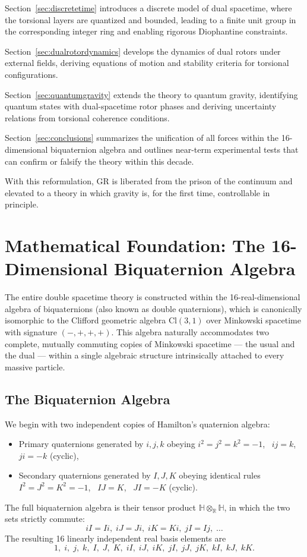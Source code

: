\documentclass[dvipdfmx,a4paper]{article}
\begin{document}
Section~\ref{sec:discretetime} introduces a discrete model of dual spacetime, where the torsional layers are quantized and bounded, leading to a finite unit group in the corresponding integer ring and enabling rigorous Diophantine constraints.

Section~\ref{sec:dualrotordynamics} develops the dynamics of dual rotors under external fields, deriving equations of motion and stability criteria for torsional configurations.

Section~\ref{sec:quantumgravity} extends the theory to quantum gravity, identifying quantum states with dual-spacetime rotor phases and deriving uncertainty relations from torsional coherence conditions.

Section~\ref{sec:conclusions} summarizes the unification of all forces within the 16-dimensional biquaternion algebra and outlines near-term experimental tests that can confirm or falsify the theory within this decade.

With this reformulation, GR is liberated from the prison of the continuum and elevated to a theory in which gravity is, for the first time, controllable in principle.

\section{Mathematical Foundation: The 16-Dimensional Biquaternion Algebra}
\label{sec:math}

The entire double spacetime theory is constructed within the 16-real-dimensional algebra of biquaternions (also known as double quaternions), which is canonically isomorphic to the Clifford geometric algebra $\mathrm{Cl}(3,1)$ over Minkowski spacetime with signature $(-,+,+,+)$. This algebra naturally accommodates two complete, mutually commuting copies of Minkowski spacetime — the usual and the dual — within a single algebraic structure intrinsically attached to every massive particle.

\subsection{The Biquaternion Algebra}

We begin with two independent copies of Hamilton's quaternion algebra:
\begin{itemize}
  \item Primary quaternions generated by $i,j,k$ obeying $i^2=j^2=k^2=-1$, \ $ij=k$, \ $ji=-k$ (cyclic),
  \item Secondary quaternions generated by $I,J,K$ obeying identical rules $I^2=J^2=K^2=-1$, \ $IJ=K$, \ $JI=-K$ (cyclic).
\end{itemize}
The full biquaternion algebra is their tensor product $\mathbb{H} \otimes_{\mathbb{R}} \mathbb{H}$, in which the two sets strictly commute:
\[
iI = Ii,\; iJ = Ji,\; iK = Ki,\; jI = Ij,\; \dots
\]
The resulting 16 linearly independent real basis elements are
\[
1,\; i,\; j,\; k,\; I,\; J,\; K,\; iI,\; iJ,\; iK,\; jI,\; jJ,\; jK,\; kI,\; kJ,\; kK.
\]
\end{document}
